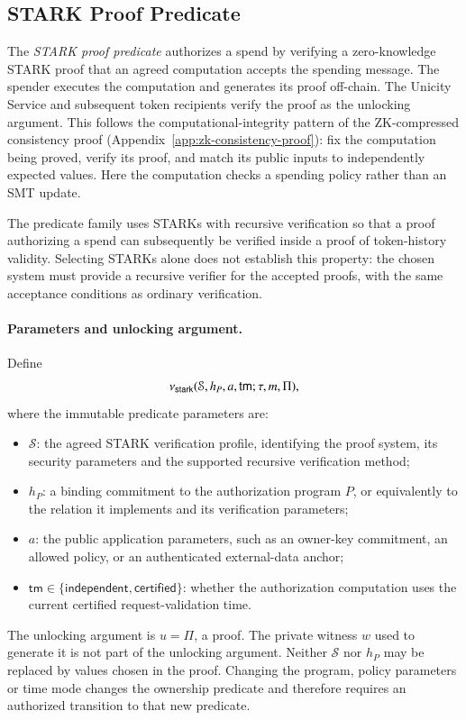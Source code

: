 \subsection{STARK Proof Predicate}\label{app:stark-predicate}

The \emph{STARK proof predicate} authorizes a spend by verifying a zero-knowledge STARK proof that an agreed computation accepts the spending message. The spender executes the computation and generates its proof off-chain. The Unicity Service and subsequent token recipients verify the proof as the unlocking argument. This follows the computational-integrity pattern of the ZK-compressed consistency proof (Appendix~\ref{app:zk-consistency-proof}): fix the computation being proved, verify its proof, and match its public inputs to independently expected values. Here the computation checks a spending policy rather than an SMT update.

The predicate family uses STARKs with recursive verification so that a proof authorizing a spend can subsequently be verified inside a proof of token-history validity. Selecting STARKs alone does not establish this property: the chosen system must provide a recursive verifier for the accepted proofs, with the same acceptance conditions as ordinary verification.

\paragraph{Parameters and unlocking argument.}
Define
\[
\nu_\mathsf{stark}(\mathcal{S},h_P,a,\mathsf{tm};\tau,m,\Pi),
\]
where the immutable predicate parameters are:
\begin{itemize}
  \item $\mathcal{S}$: the agreed STARK verification profile, identifying the proof system, its security parameters and the supported recursive verification method;
  \item $h_P$: a binding commitment to the authorization program $P$, or equivalently to the relation it implements and its verification parameters;
  \item $a$: the public application parameters, such as an owner-key commitment, an allowed policy, or an authenticated external-data anchor;
  \item $\mathsf{tm}\in\{\mathsf{independent},\mathsf{certified}\}$: whether the authorization computation uses the current certified request-validation time.
\end{itemize}
The unlocking argument is $u=\Pi$, a proof. The private witness $w$ used to generate it is not part of the unlocking argument. Neither $\mathcal{S}$ nor $h_P$ may be replaced by values chosen in the proof. Changing the program, policy parameters or time mode changes the ownership predicate and therefore requires an authorized transition to that new predicate.

